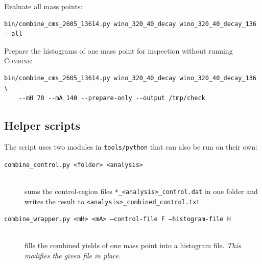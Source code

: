 \documentclass[11pt,a4paper]{article}
\newcommand{\combine}{\textsc{Combine}}
\newcommand{\file}[1]{\texttt{#1}}
\begin{document}
Evaluate all mass points:
\begin{lstlisting}
bin/combine_cms_2605_13614.py wino_320_40_decay wino_320_40_decay_136 --all
\end{lstlisting}

Prepare the histograms of one mass point for inspection without running
\combine{}:
\begin{lstlisting}
bin/combine_cms_2605_13614.py wino_320_40_decay wino_320_40_decay_136 \
    --mH 70 --mA 140 --prepare-only --output /tmp/check
\end{lstlisting}

\subsection{Helper scripts}

The script uses two modules in \file{tools/python} that can also be run on
their own:
\begin{description}
  \item[\file{combine\_control.py <folder> <analysis>}] \mbox{}\\
        sums the control-region files \file{*\_<analysis>\_control.dat}
        in one folder and writes the result to
        \file{<analysis>\_combined\_control.txt}.
  \item[\file{combine\_wrapper.py <mH> <mA> --control-file F --histogram-file H}]
        \mbox{}\\ fills the combined yields of one mass point into a
        histogram file. \emph{This modifies the given file in place.}
\end{description}
\end{document}
